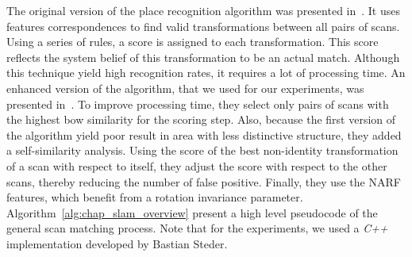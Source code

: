 The original version of the place recognition algorithm was presented in~\cite{Steder2010}. It uses features correspondences to find valid transformations between all pairs of scans. Using a series of rules, a score is assigned to each transformation. This score reflects the system belief of this transformation to be an actual match. Although this technique yield high recognition rates, it requires a lot of processing time. An enhanced version of the algorithm, that we used for our experiments, was presented in~\cite{Steder2011b}. To improve processing time, they select only pairs of scans with the highest \gls*{bow} similarity for the scoring step. Also, because the first version of the algorithm yield poor result in area with less distinctive structure, they added a self-similarity analysis. Using the score of the best non-identity transformation of a scan with respect to itself, they adjust the score with respect to the other scans, thereby reducing the number of false positive. Finally, they use the NARF features, which benefit from a rotation invariance parameter. Algorithm~\ref{alg:chap_slam_overview} present a high level pseudocode of the general scan matching process. Note that for the experiments, we used a \textit{C++} implementation developed by Bastian Steder.

